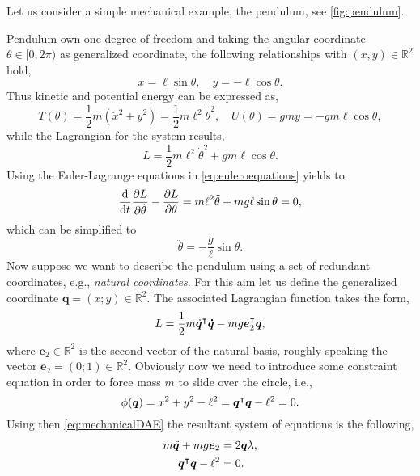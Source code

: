 		\begin{example}
			\label{ex:pendulum1}
			Let us consider a simple mechanical example, the pendulum, see \cref{fig:pendulum}. 
			
			Pendulum own one-degree of freedom and taking the angular coordinate $\theta\in[0,2\pi)$ as generalized coordinate, the following relationships with $(x,y)\in\mathbb{R}^{2}$ hold, 
			\begin{equation*}
					x = \ell\sin{\theta}, \quad y = -\ell\cos{\theta}.
			\end{equation*}
			Thus kinetic and potential energy can be expressed as, 
			\begin{equation*}
				T(\theta) = \frac{1}{2}m(\dot{x}^{2}+\dot{y}^{2}) = \frac{1}{2}m\ell^{2}\dot{\theta}^{2},\quad U(\theta) = gmy = -gm\ell\cos{\theta}, 
			\end{equation*}
			while the Lagrangian for the system results, 
			\begin{equation*}
				L = \frac{1}{2}m\ell^{2}\dot{\theta}^{2} + gm\ell\cos{\theta}.
			\end{equation*}
			Using the Euler-Lagrange equations in \cref{eq:euleroequations} yields to
			\begin{equation*}
				\frac{\mathop{}\!\mathrm{d}}{\mathop{}\!\mathrm{d} t}\frac{\partial L}{\partial\dot{\theta}}-\frac{\partial L}{\partial\theta} = m\ell^{2}\ddot{\theta} + mg\ell\sin{\theta} = 0,
			\end{equation*}
			which can be simplified to
			\begin{equation*}
				\ddot{\theta} = -\frac{g}{\ell}\sin{\theta}.
			\end{equation*}
			Now suppose we want to describe the pendulum using a set of redundant coordinates, e.g., \emph{natural coordinates}. For this aim let us define the generalized coordinate $\bm{q} = (x;y)\in\mathbb{R}^{2}$. The associated Lagrangian function takes the form, 
			\begin{equation*}
				L = \frac{1}{2}m\dot{\bm{q}}^{\intercal}\bm{\dot{q}} - mg\bm{e}^{\intercal}_{2}\bm{q},
			\end{equation*}
			where $\bm{e}_{2}\in\mathbb{R}^{2}$ is the second vector of the natural basis, roughly speaking the vector $\bm{e}_{2} = (0;1)\in\mathbb{R}^{2}$. Obviously now we need to introduce some constraint equation in order to force mass $m$ to slide over the circle, i.e., 
			\begin{equation*}
				\phi(\bm{q}) = x^{2}+y^{2} - \ell^{2} = \bm{q}^{\intercal}\bm{q}-\ell^{2} = 0.
			\end{equation*}
			Using then \cref{eq:mechanicalDAE} the resultant system of equations is the following, 
			\begin{subequations}
				\begin{align*}
					m\ddot{\bm{q}} + mg\bm{e}_{2} &= 2\bm{q}\lambda, \\
					\bm{q}^{\intercal}\bm{q}-\ell^{2} &= 0.
				\end{align*}
			\end{subequations}
		\end{example}
		
